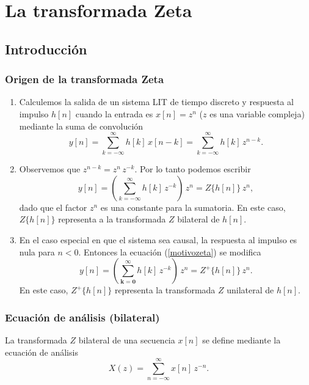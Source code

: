 \chapter{La transformada Zeta}

\section{Introducci\'{o}n}

\subsection{Origen de la transformada Zeta}

\begin{enumerate}

\item Calculemos la salida de un sistema LIT de tiempo discreto y respuesta al impulso $h[n]$ cuando la
entrada es $x[n] = z^{n}$ ($z$ es una variable compleja) mediante la suma de convoluci\'{o}n
\begin{equation}
   y[n] = \sum_{k=-\infty}^{\infty} h[k] \, x[n-k] = 
          \sum_{k=-\infty}^{\infty} h[k] \, z^{n-k}.
\end{equation}

\item Observemos que $z^{n-k} = z^{n} \, z^{-k}$. Por lo tanto podemos escribir
\begin{equation}
   y[n] = \left(\sum_{k=-\infty}^{\infty} h[k] \, z^{-k} \right) \, z^{n} = Z\{h[n]\} \, z^{n}, \label{motivozeta}
\end{equation}
dado que el factor $z^{n}$ es una constante para la sumatoria. En este caso, $Z\{h[n]\}$ representa a la
transformada $Z$ bilateral de $h[n]$.

\item En el caso especial en que el sistema sea causal, la respuesta al impulso es nula para $n<0$. 
Entonces la ecuaci\'{o}n (\ref{motivozeta}) se modifica
\begin{equation}
   y[n] = \left(\sum_{\mathbf{k=0}}^{\infty} h[k] \, z^{-k} \right) \, z^{n} = Z^{+}\{h[n]\} \, z^{n}.
\end{equation}
En este caso, $Z^{+}\{h[n]\}$ representa la transformada $Z$ unilateral de $h[n]$.
\end{enumerate}

\subsection{Ecuaci\'{o}n de an\'{a}lisis (bilateral)}
La transformada $Z$ bilateral de una secuencia $x\left[ n\right] $ se define mediante la ecuaci\'{o}n de 
an\'{a}lisis 
\begin{equation}
        X\left( z\right) =\sum_{n=-\infty }^{\infty }x\left[ n\right] \, z^{-n}.
\end{equation}

